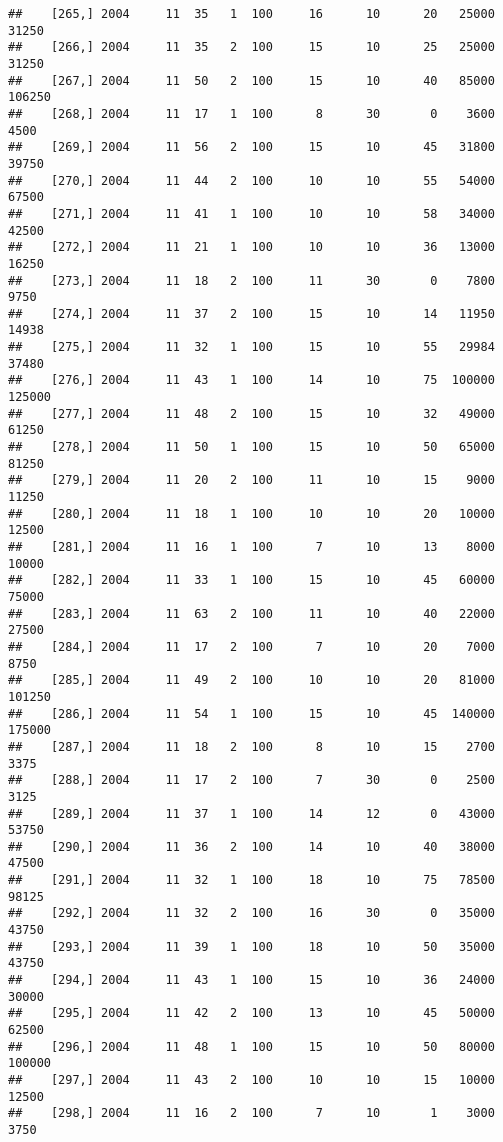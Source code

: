 \documentclass{article}\usepackage[]{graphicx}\usepackage[]{color}
\makeatletter
\newenvironment{kframe}{%
 \def\at@end@of@kframe{}%
 \ifinner\ifhmode%
  \def\at@end@of@kframe{\end{minipage}}%
  \begin{minipage}{\columnwidth}%
 \fi\fi%
 \def\FrameCommand##1{\hskip\@totalleftmargin \hskip-\fboxsep
 \colorbox{shadecolor}{##1}\hskip-\fboxsep
     \hskip-\linewidth \hskip-\@totalleftmargin \hskip\columnwidth}%
 \MakeFramed {\advance\hsize-\width
   \@totalleftmargin\z@ \linewidth\hsize
   \@setminipage}}%
 {\par\unskip\endMakeFramed%
 \at@end@of@kframe}
\newenvironment{knitrout}{}{} %
\makeatother
\begin{document}
\begin{knitrout}
\begin{kframe}
\begin{verbatim}
##    [265,] 2004     11  35   1  100     16      10      20   25000   31250
##    [266,] 2004     11  35   2  100     15      10      25   25000   31250
##    [267,] 2004     11  50   2  100     15      10      40   85000  106250
##    [268,] 2004     11  17   1  100      8      30       0    3600    4500
##    [269,] 2004     11  56   2  100     15      10      45   31800   39750
##    [270,] 2004     11  44   2  100     10      10      55   54000   67500
##    [271,] 2004     11  41   1  100     10      10      58   34000   42500
##    [272,] 2004     11  21   1  100     10      10      36   13000   16250
##    [273,] 2004     11  18   2  100     11      30       0    7800    9750
##    [274,] 2004     11  37   2  100     15      10      14   11950   14938
##    [275,] 2004     11  32   1  100     15      10      55   29984   37480
##    [276,] 2004     11  43   1  100     14      10      75  100000  125000
##    [277,] 2004     11  48   2  100     15      10      32   49000   61250
##    [278,] 2004     11  50   1  100     15      10      50   65000   81250
##    [279,] 2004     11  20   2  100     11      10      15    9000   11250
##    [280,] 2004     11  18   1  100     10      10      20   10000   12500
##    [281,] 2004     11  16   1  100      7      10      13    8000   10000
##    [282,] 2004     11  33   1  100     15      10      45   60000   75000
##    [283,] 2004     11  63   2  100     11      10      40   22000   27500
##    [284,] 2004     11  17   2  100      7      10      20    7000    8750
##    [285,] 2004     11  49   2  100     10      10      20   81000  101250
##    [286,] 2004     11  54   1  100     15      10      45  140000  175000
##    [287,] 2004     11  18   2  100      8      10      15    2700    3375
##    [288,] 2004     11  17   2  100      7      30       0    2500    3125
##    [289,] 2004     11  37   1  100     14      12       0   43000   53750
##    [290,] 2004     11  36   2  100     14      10      40   38000   47500
##    [291,] 2004     11  32   1  100     18      10      75   78500   98125
##    [292,] 2004     11  32   2  100     16      30       0   35000   43750
##    [293,] 2004     11  39   1  100     18      10      50   35000   43750
##    [294,] 2004     11  43   1  100     15      10      36   24000   30000
##    [295,] 2004     11  42   2  100     13      10      45   50000   62500
##    [296,] 2004     11  48   1  100     15      10      50   80000  100000
##    [297,] 2004     11  43   2  100     10      10      15   10000   12500
##    [298,] 2004     11  16   2  100      7      10       1    3000    3750

\end{verbatim}
\end{kframe}
\end{knitrout}
\end{document}
